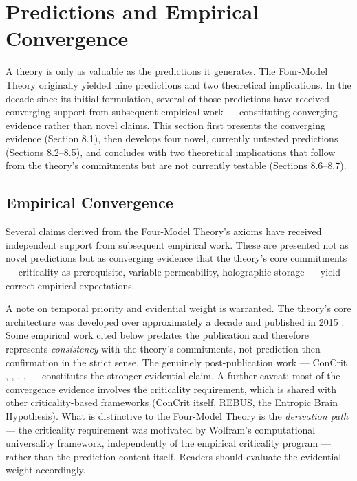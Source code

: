 \documentclass[12pt]{article}
\begin{document}
\section{Predictions and Empirical Convergence}


A theory is only as valuable as the predictions it generates. The Four-Model Theory originally yielded nine predictions \citep{Gruber2015} and two theoretical implications. In the decade since its initial formulation, several of those predictions have received converging support from subsequent empirical work --- constituting converging evidence rather than novel claims. This section first presents the converging evidence (Section 8.1), then develops four novel, currently untested predictions (Sections 8.2--8.5), and concludes with two theoretical implications that follow from the theory's commitments but are not currently testable (Sections 8.6--8.7).


\subsection{Empirical Convergence}


Several claims derived from the Four-Model Theory's axioms have received independent support from subsequent empirical work. These are presented not as novel predictions but as converging evidence that the theory's core commitments --- criticality as prerequisite, variable permeability, holographic storage --- yield correct empirical expectations.

A note on temporal priority and evidential weight is warranted. The theory's core architecture was developed over approximately a decade and published in 2015 \citep{Gruber2015}. Some empirical work cited below predates the publication \citep{Casali2013,CarhartHarris2014} and therefore represents \emph{consistency} with the theory's commitments, not prediction-then-confirmation in the strict sense. The genuinely post-publication work --- ConCrit \citep{AlgomShriki2026}, \citet{HengenShew2025}, \citet{Bhatt2024}, \citet{Li2025}, \citet{Pinto2017} --- constitutes the stronger evidential claim. A further caveat: most of the convergence evidence involves the criticality requirement, which is shared with other criticality-based frameworks (ConCrit itself, REBUS, the Entropic Brain Hypothesis). What is distinctive to the Four-Model Theory is the \emph{derivation path} --- the criticality requirement was motivated by Wolfram's computational universality framework, independently of the empirical criticality program --- rather than the prediction content itself. Readers should evaluate the evidential weight accordingly.
\end{document}
